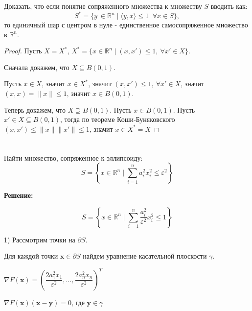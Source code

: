 \documentclass[a4paper,12pt]{article}
\newcommand{\lt}{\left}
\newcommand{\rt}{\right}
\begin{document}
	Доказать, что если понятие сопряженного множества к множеству $S$ вводить как: $$S^* = \{y \ \in \mathbb{R}^n \mid \langle y, x\rangle \le 1 \;\; \forall x \in S\}, $$ то единичный шар с центром в нуле - единственное самосопряженное множество в $\mathbb{R}^n$.
	
	
	\begin{proof}
		
		Пусть $X = X^*$, $X^* = \{x \in \mathbb{R}^n \mid (x, x') \le 1,\ \forall x' \in X\}$. 
		
		Сначала докажем, что $X \subseteq B(0, 1)$. 
		
		Пусть $x \in X$, значит $x \in X^*$, значит $(x, x') \le 1,\ \forall x' \in X$, значит $(x, x) = \|x\| \le 1$, значит $x \in B(0, 1)$. 
		
		Теперь докажем, что $X \supseteq B(0, 1)$. Пусть $x \in B(0, 1)$. Пусть $x' \in X \subseteq B(0, 1)$, тогда по теореме Коши-Буняковского $(x, x') \le \|x\|\|x'\| \le 1$, значит $x \in X^* = X$
\end{proof}
	
	
	\section{}
	
	Найти множество, сопряженное к эллипсоиду: $$ S = \left\{ x \in \mathbb{R}^n \mid \sum\limits_{i = 1}^n a_i^2x_i^2 \le \varepsilon^2 \right\}$$
	
	\vspace{\baselineskip}
	
	\textbf{Решение:}
	
	\vspace{\baselineskip}
	
	\begin{equation}\label{s1}
	S = \left\{ x \in \mathbb{R}^n \mid \sum\limits_{i = 1}^n \frac{a_i^2}{\varepsilon^2}x_i^2 \le 1 \right\}
	\end{equation}
	
	1) Рассмотрим точки на $\partial S$.
		
	Для каждой точки $\mathbf{x} \in \partial S$ найдем уравнение касательной плоскости $\gamma$.
	
	\vspace{\baselineskip}
	
	$\nabla F (\mathbf{x}) = \lt(\dfrac{2a_1^2x_1}{\varepsilon^2}, \dots , \dfrac{2a_n^2x_n}{\varepsilon^2}\rt)^T$
	
	$\nabla F (\mathbf{x}) \lt( \mathbf{x} - \mathbf{y} \rt) = 0$, где $\mathbf{y} \in \gamma $
	
\end{document}
